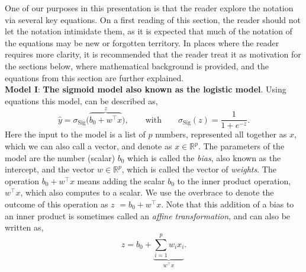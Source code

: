 \documentclass[12pt]{article}
\begin{document}
One of our purposes in this presentation is that the reader explore the notation via several key equations. On a first reading of this section, the reader should not let the notation intimidate them, as it is expected that much of the notation of the equations may be new or forgotten territory. In places where the reader requires more clarity, it is recommended that the reader treat it as motivation for the sections below, where mathematical background is provided, and the equations from this section are further explained. \\

\noindent
{\bf Model I}: {\bf The sigmoid model also known as the logistic model}. Using equations this model, can be described as,
%
\begin{equation}
\label{eq:first-shallow-view}
\hat{y}=\sigma_{\text{Sig}}\big(\overbrace{b_0+w^\top  x}^{z}\big),
\qquad
\text{with}
\qquad
\sigma_{\text{Sig}}(z) = \frac{1}{1+e^{-z}}.
\end{equation}
%
Here the input to the model is a list of $p$ numbers, represented all together as $x$, which we can also call a vector, and denote as $x\in {\mathbb R}^p$. The parameters of the model are the number (scalar) $b_0$ which is called the {\em bias}, also known as the intercept, and the vector $w\in {\mathbb R}^p$, which is called the vector of {\em weights}. The operation $b_0 + w^\top x$ means adding the scalar $b_0$ to the inner product operation, $w^\top x$, which also computes to a scalar. We use the overbrace to denote the outcome of this operation as $z$ $=b_0+w^\top x$. Note that this addition of a bias to an inner product is sometimes called an {\em affine transformation}, and can also be written as,
%
\begin{equation}
\label{eq:smallz-only-log-mult}
z = b_0 + \underbrace{\sum_{i=1}^p w_i x_i}_{w^\top x}.
\end{equation}
\end{document}
